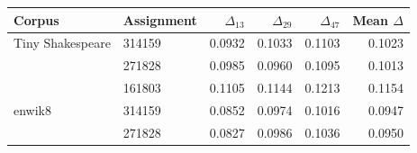 \begin{tabular}{llrrrr}
\toprule
Corpus & Assignment & $\Delta_{13}$ & $\Delta_{29}$ & $\Delta_{47}$ & Mean $\Delta$ \\
\midrule
Tiny Shakespeare & 314159 & 0.0932 & 0.1033 & 0.1103 & 0.1023 \\
 & 271828 & 0.0985 & 0.0960 & 0.1095 & 0.1013 \\
 & 161803 & 0.1105 & 0.1144 & 0.1213 & 0.1154 \\
enwik8 & 314159 & 0.0852 & 0.0974 & 0.1016 & 0.0947 \\
 & 271828 & 0.0827 & 0.0986 & 0.1036 & 0.0950 \\
\bottomrule
\end{tabular}
